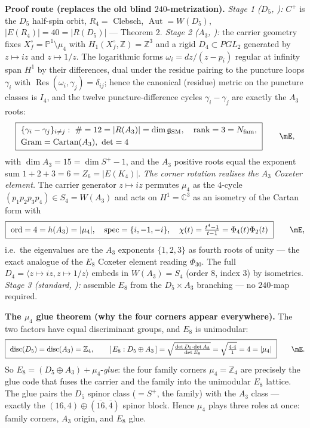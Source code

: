 \documentclass[11pt,a4paper]{article}
\newcommand{\Nfam}{N_{\mathrm{fam}}}
\newcommand{\dimg}{\dim\mathfrak g_{\mathrm{SM}}}
\theoremstyle{definition}
\begin{document}
\noindent\textbf{Proof route (replaces the old blind $240$-metrization).}
\emph{Stage 1 ($D_5$, \mE):} $C^+$ is the $D_5$ half-spin orbit, $R_4=$ Clebsch, $\operatorname{Aut}=W(D_5)$,
$|E(R_4)|=40=|R(D_5)|$ --- Theorem 2.
\emph{Stage 2 ($A_3$, \mE):} the carrier geometry fixes $X_f^\circ=\mathbb P^1\setminus\mu_4$ with
$H_1(X_f^\circ,\mathbb Z)=\mathbb Z^3$ and a rigid $D_4\subset PGL_2$ generated by $z\mapsto iz$ and
$z\mapsto 1/z$. The logarithmic forms $\omega_i=dz/(z-p_i)$ regular at infinity span $H^1$ by their
differences, dual under the residue pairing to the puncture loops $\gamma_i$ with $\operatorname{Res}(\omega_i,\gamma_j)=\delta_{ij}$;
hence the canonical (residue) metric on the puncture classes is $I_4$, and the twelve
puncture-difference cycles $\gamma_i-\gamma_j$ are exactly the $A_3$ roots:
\begin{equation}
  \boxed{\ \begin{aligned}
    &\{\gamma_i-\gamma_j\}_{i\ne j}:\ \#=12=|R(A_3)|=\dimg,\quad \operatorname{rank}=3=\Nfam,\\
    &\text{Gram}=\text{Cartan}(A_3),\ \det=4
  \end{aligned}\ }\qquad\mE ,
\end{equation}
with $\dim A_3=15=\dim S^+-1$, and the $A_3$ positive roots equal the exponent sum $1{+}2{+}3=6=Z_6=|E(K_4)|$.
\emph{The corner rotation realises the $A_3$ Coxeter element.} The carrier generator $z\mapsto iz$
permutes $\mu_4$ as the $4$-cycle $(p_1p_2p_3p_4)\in S_4=W(A_3)$ and acts on $H^1=\mathbb C^3$ as an
isometry of the Cartan form with
\begin{equation}
  \boxed{\ \text{ord}=4=h(A_3)=|\mu_4|,\quad \text{spec}=\{i,-1,-i\},\quad
  \chi(t)=\tfrac{t^4-1}{t-1}=\Phi_4(t)\Phi_2(t)\ }\qquad\mE ,
\end{equation}
i.e.\ the eigenvalues are the $A_3$ exponents $\{1,2,3\}$ as fourth roots of unity --- the exact analogue
of the $E_8$ Coxeter element reading $\Phi_{30}$. The full $D_4=\langle z\mapsto iz,z\mapsto1/z\rangle$
embeds in $W(A_3)=S_4$ (order $8$, index $3$) by isometries. \emph{Stage 3 (standard, \mE):} assemble
$E_8$ from the $D_5\times A_3$ branching --- no $240$-map required.

\noindent\textbf{The $\mu_4$ glue theorem (why the four corners appear everywhere).} The two factors
have equal discriminant groups, and $E_8$ is unimodular:
\begin{equation}
  \boxed{\ \operatorname{disc}(D_5)=\operatorname{disc}(A_3)=\mathbb Z_4,\qquad
  [\,E_8:D_5\oplus A_3\,]=\sqrt{\tfrac{\det D_5\cdot\det A_3}{\det E_8}}=\sqrt{\tfrac{4\cdot4}{1}}=4=|\mu_4|\ }\qquad\mE .
\end{equation}
So $E_8=(D_5\oplus A_3)+\mu_4$-\emph{glue}: the four family corners $\mu_4=\mathbb Z_4$ are precisely the
glue code that fuses the carrier and the family into the unimodular $E_8$ lattice. The glue pairs the
$D_5$ spinor class ($=S^+$, the family) with the $A_3$ class --- exactly the $(16,4)\oplus(\overline{16},\overline4)$
spinor block. Hence $\mu_4$ plays three roles at once: family corners, $A_3$ origin, and $E_8$ glue.
\end{document}
